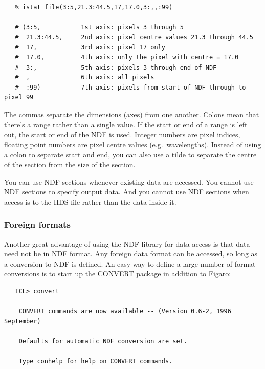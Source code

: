 \documentclass[11pt,twoside]{article}
\begin{document}
\begin{verbatim}
   % istat file(3:5,21.3:44.5,17,17.0,3:,,:99)

   # (3:5,           1st axis: pixels 3 through 5
   #  21.3:44.5,     2nd axis: pixel centre values 21.3 through 44.5
   #  17,            3rd axis: pixel 17 only
   #  17.0,          4th axis: only the pixel with centre = 17.0
   #  3:,            5th axis: pixels 3 through end of NDF
   #  ,              6th axis: all pixels
   #  :99)           7th axis: pixels from start of NDF through to pixel 99
\end{verbatim}

   The commas separate the dimensions (axes) from one another. Colons
   mean that there's a range rather than a single value. If the start
   or end of a range is left out, the start or end of the NDF is
   used. Integer numbers are pixel indices, floating point numbers are
   pixel centre values (e.g.\ wavelengths). Instead of using a colon
   to separate start and end, you can also use a tilde to separate the
   centre of the section from the size of the section.

   You can use NDF sections whenever existing data are accessed. You
   cannot use NDF sections to specify output data. And you cannot use
   NDF sections when access is to the HDS file rather than the data
   inside it.


\subsubsection{\label{filesndfforeign}Foreign formats}

   Another great advantage of using the NDF library for data access is
   that data need not be in NDF format. Any foreign data format can be
   accessed, so long as a conversion to NDF is defined. An easy way to
   define a large number of format conversions is to start up the
   CONVERT package in addition to Figaro:

\begin{verbatim}
   ICL> convert

    CONVERT commands are now available -- (Version 0.6-2, 1996 September)

    Defaults for automatic NDF conversion are set.

    Type conhelp for help on CONVERT commands.
\end{verbatim}
\end{document}
